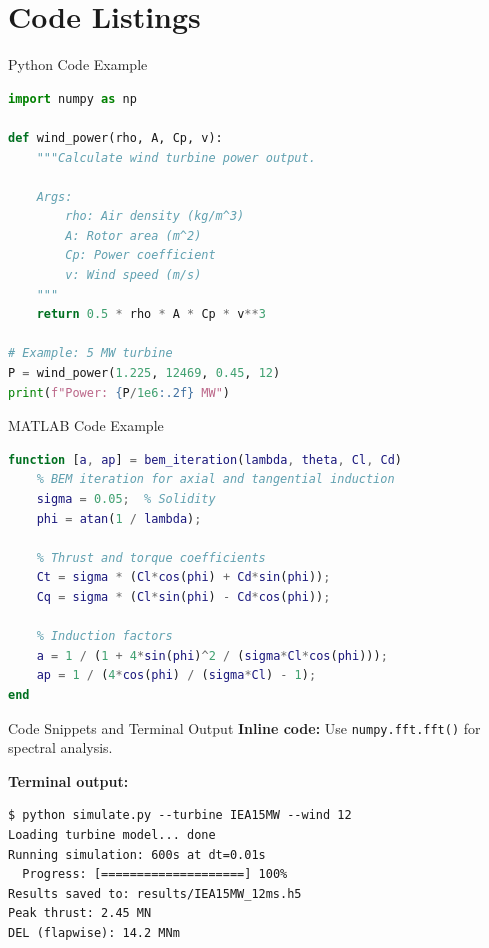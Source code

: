 
\section{Code Listings}

\begin{frame}[fragile]{Python Code Example}
    \begin{lstlisting}[language=Python, caption={Wind power calculation}]
import numpy as np

def wind_power(rho, A, Cp, v):
    """Calculate wind turbine power output.

    Args:
        rho: Air density (kg/m^3)
        A: Rotor area (m^2)
        Cp: Power coefficient
        v: Wind speed (m/s)
    """
    return 0.5 * rho * A * Cp * v**3

# Example: 5 MW turbine
P = wind_power(1.225, 12469, 0.45, 12)
print(f"Power: {P/1e6:.2f} MW")
    \end{lstlisting}
\end{frame}

\begin{frame}[fragile]{MATLAB Code Example}
    \begin{lstlisting}[language=Matlab, caption={Blade element momentum theory}]
function [a, ap] = bem_iteration(lambda, theta, Cl, Cd)
    % BEM iteration for axial and tangential induction
    sigma = 0.05;  % Solidity
    phi = atan(1 / lambda);

    % Thrust and torque coefficients
    Ct = sigma * (Cl*cos(phi) + Cd*sin(phi));
    Cq = sigma * (Cl*sin(phi) - Cd*cos(phi));

    % Induction factors
    a = 1 / (1 + 4*sin(phi)^2 / (sigma*Cl*cos(phi)));
    ap = 1 / (4*cos(phi) / (sigma*Cl) - 1);
end
    \end{lstlisting}
\end{frame}

\begin{frame}[fragile]{Code Snippets and Terminal Output}
    \textbf{Inline code:} Use \lstinline|numpy.fft.fft()| for spectral analysis.

    \vspace{0.5cm}

    \textbf{Terminal output:}
    \begin{lstlisting}[style=terminal]
$ python simulate.py --turbine IEA15MW --wind 12
Loading turbine model... done
Running simulation: 600s at dt=0.01s
  Progress: [====================] 100%
Results saved to: results/IEA15MW_12ms.h5
Peak thrust: 2.45 MN
DEL (flapwise): 14.2 MNm
    \end{lstlisting}
\end{frame}

